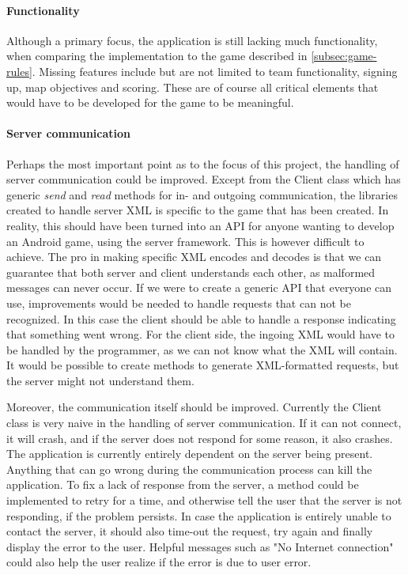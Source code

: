 \paragraph{Functionality}
Although a primary focus, the application is still lacking much functionality, when comparing the implementation to the game described in \ref{subsec:game-rules}. Missing features include but are not limited to team functionality, signing up, map objectives and scoring. These are of course all critical elements that would have to be developed for the game to be meaningful.

\paragraph{Server communication}
Perhaps the most important point as to the focus of this project, the handling of server communication could be improved. Except from the Client class which has generic \textit{send} and \textit{read} methods for in- and outgoing communication, the libraries created to handle server XML is specific to the game that has been created. In reality, this should have been turned into an API for anyone wanting to develop an Android game, using the server framework. This is however difficult to achieve. The pro in making specific XML encodes and decodes is that we can guarantee that both server and client understands each other, as malformed messages can never occur. If we were to create a generic API that everyone can use, improvements would be needed to handle requests that can not be recognized. In this case the client should be able to handle a response indicating that something went wrong. For the client side, the ingoing XML would have to be handled by the programmer, as we can not know what the XML will contain. It would be possible to create methods to generate XML-formatted requests, but the server might not understand them.

Moreover, the communication itself should be improved. Currently the Client class is very naive in the handling of server communication. If it can not connect, it will crash, and if the server does not respond for some reason, it also crashes. The application is currently entirely dependent on the server being present. Anything that can go wrong during the communication process can kill the application. To fix a lack of response from the server, a method could be implemented to retry for a time, and otherwise tell the user that the server is not responding, if the problem persists. In case the application is entirely unable to contact the server, it should also time-out the request, try again and finally display the error to the user. Helpful messages such as "No Internet connection" could also help the user realize if the error is due to user error.
